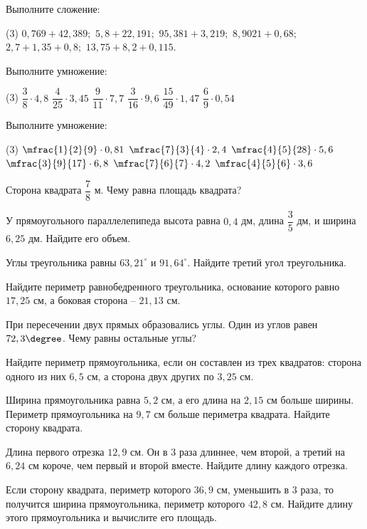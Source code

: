 \begin{class}[number=3]
	\begin{listofex}
		\item Выполните сложение: \begin{tasks}(3)
			\task \( 0,769 + 42,389; \)
			\task \( 5,8 + 22,191;  \)
			\task \( 95,381 + 3,219; \)
			\task \( 8,9021 + 0,68;  \)
			\task\(  2,7 + 1,35 + 0,8;  \)
			\task\( 13,75 + 8,2 + 0,115. \)
		\end{tasks}
		\item Выполните умножение:\begin{tasks}(3)
			\task \( \dfrac{3}{8}\cdot4,8 \)
			\task\( \dfrac{4}{25}\cdot3,45 \)
			\task\( \dfrac{9}{11}\cdot7,7 \)
			\task\( \dfrac{3}{16}\cdot9,6 \)
			\task\( \dfrac{15}{49}\cdot1,47 \)
			\task\( \dfrac{6}{9}\cdot0,54 \)
		\end{tasks}
		\item Выполните умножение:
		\begin{tasks}(3)
			\task \( \mfrac{1}{2}{9}\cdot0,81 \)
			\task \( \mfrac{7}{3}{4}\cdot2,4 \)
			\task \( \mfrac{4}{5}{28}\cdot 5,6 \)
			\task \( \mfrac{3}{9}{17} \cdot 6,8 \)
			\task \( \mfrac{7}{6}{7}\cdot 4,2 \)
			\task \( \mfrac{4}{5}{6}\cdot3,6 \)
		\end{tasks}
		\item Сторона квадрата \( \dfrac{7}{8} \) м. Чему равна площадь квадрата?
		\item У прямоугольного параллелепипеда высота равна \( 0,4 \) дм, длина \( \dfrac{3}{5} \) дм, и ширина \( 6,25 \) дм. Найдите его объем.
		\item Углы треугольника равны \( 63,21^{\circ} \) и \( 91,64^{\circ} \). Найдите третий угол треугольника.
		\item Найдите периметр равнобедренного треугольника, основание которого равно \( 17,25 \) см, а боковая сторона – \( 21,13 \) см.
		\item При пересечении двух прямых образовались углы. Один из углов равен \( 72,3\degree \). Чему равны остальные углы?
		\item Найдите периметр прямоугольника, если он составлен из трех квадратов: сторона одного из них \( 6,5 \) см, а сторона двух других по \( 3,25 \) см. 
		\item Ширина прямоугольника равна \( 5,2 \) см, а его длина на \( 2,15 \) см больше ширины. Периметр прямоугольника на \( 9,7 \) см больше периметра квадрата. Найдите сторону квадрата.
		\item Длина первого отрезка \( 12,9 \) см. Он в \( 3 \) раза длиннее, чем второй, а третий на \( 6,24 \) см короче, чем первый и второй вместе. Найдите длину каждого отрезка.
		\item Если сторону квадрата, периметр которого \( 36,9 \) см, уменьшить в 3 раза, то получится ширина прямоугольника, периметр которого \( 42,8 \) см. Найдите длину этого прямоугольника и вычислите его площадь.
	\end{listofex}
\end{class}

